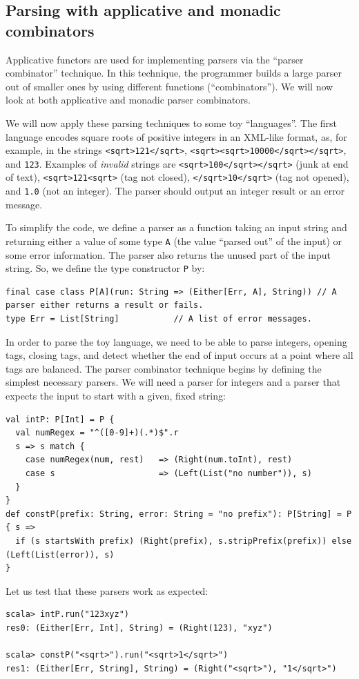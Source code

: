 \subsection{Parsing with applicative and monadic combinators\label{subsec:Parsing-with-applicative-and-monadic-parsers}}

Applicative functors are used for implementing parsers via the \textsf{``}parser
combinator\textsf{''} technique. In this technique, the programmer builds
a large parser out of smaller ones by using different functions (\textsf{``}combinators\textsf{''}).
We will now look at both applicative and monadic parser combinators.

We will now apply these parsing techniques to some toy \textsf{``}languages\textsf{''}.
The first language encodes square roots of positive integers in an
XML-like format, as, for example, in the strings \lstinline!<sqrt>121</sqrt>!,
\lstinline!<sqrt><sqrt>10000</sqrt></sqrt>!, and \lstinline!123!.
Examples of \emph{invalid} strings are \lstinline!<sqrt>100</sqrt></sqrt>!
(junk at end of text), \lstinline!<sqrt>121<sqrt>! (tag not closed),
\lstinline!</sqrt>10</sqrt>! (tag not opened), and \lstinline!1.0!
(not an integer). The parser should output an integer result or an
error message.

To simplify the code, we define a parser as a function taking an input
string and returning either a value of some type \lstinline!A! (the
value \textsf{``}parsed out\textsf{''} of the input) or some error information. The
parser also returns the unused part of the input string. So, we define
the type constructor \lstinline!P! by:
\begin{lstlisting}
final case class P[A](run: String => (Either[Err, A], String)) // A parser either returns a result or fails.
type Err = List[String]           // A list of error messages.
\end{lstlisting}

In order to parse the toy language, we need to be able to parse integers,
opening tags, closing tags, and detect whether the end of input occurs
at a point where all tags are balanced. The parser combinator technique
begins by defining the simplest necessary parsers. We will need a
parser for integers and a parser that expects the input to start with
a given, fixed string:
\begin{lstlisting}
val intP: P[Int] = P { 
  val numRegex = "^([0-9]+)(.*)$".r
  s => s match {
    case numRegex(num, rest)   => (Right(num.toInt), rest)
    case s                     => (Left(List("no number")), s)
  } 
}
def constP(prefix: String, error: String = "no prefix"): P[String] = P { s =>
  if (s startsWith prefix) (Right(prefix), s.stripPrefix(prefix)) else (Left(List(error)), s)
}
\end{lstlisting}
Let us test that these parsers work as expected:
\begin{lstlisting}
scala> intP.run("123xyz")
res0: (Either[Err, Int], String) = (Right(123), "xyz")

scala> constP("<sqrt>").run("<sqrt>1</sqrt>")
res1: (Either[Err, String], String) = (Right("<sqrt>"), "1</sqrt>")
\end{lstlisting}

